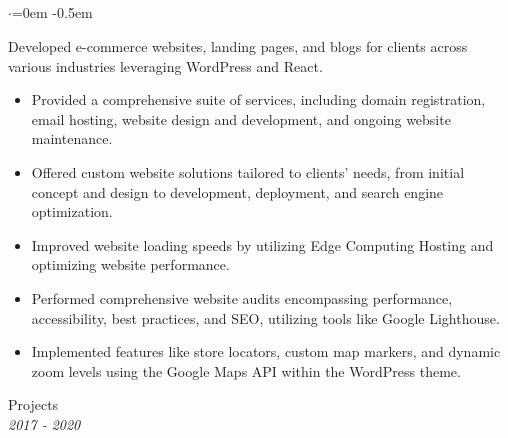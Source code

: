 \documentclass{article}
\begin{document}
\subsection*{}
\vspace{-2.6em}
\begin{list}{$\cdot$}{\leftmargin=0em} %
    \itemsep -0.5em \vspace{-0.5em} %
    \item Developed e-commerce websites, landing pages, and blogs for clients across various industries leveraging WordPress and React.
\end{list}
\vspace{-1.6em}
\begin{itemize}
    \item Provided a comprehensive suite of services, including domain registration, email hosting, website design and development, and ongoing website maintenance.
    \item Offered custom website solutions tailored to clients' needs, from initial concept and design to development, deployment, and search engine optimization.
    \item Improved website loading speeds  by utilizing Edge Computing Hosting and optimizing website performance.
    \item Performed comprehensive website audits encompassing performance, accessibility, best practices, and SEO, utilizing tools like Google Lighthouse.
    \item Implemented features like store locators, custom map markers, and dynamic zoom levels using the Google Maps API within the WordPress theme.
\end{itemize}


\hspace{-2.em}
{\bf}Projects  \hfill {} \\%
{\em } \hfill {\em 2017 - 2020 } %
\end{document}
